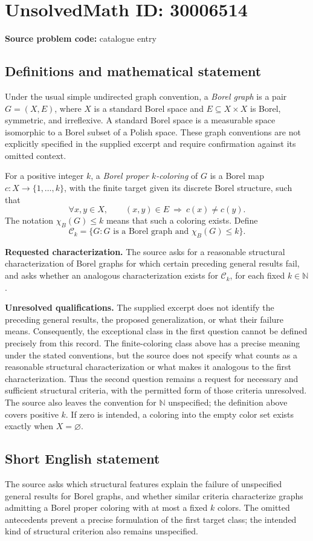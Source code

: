 \documentclass[11pt]{article}
\begin{document}
\section*{UnsolvedMath ID: 30006514}
\textbf{Source problem code:} catalogue entry
\subsection{Definitions and mathematical statement}
Under the usual simple undirected graph convention, a \emph{Borel graph} is a pair \(G=(X,E)\), where \(X\) is a standard Borel space and \(E\subseteq X\times X\) is Borel, symmetric, and irreflexive. A standard Borel space is a measurable space isomorphic to a Borel subset of a Polish space. These graph conventions are not explicitly specified in the supplied excerpt and require confirmation against its omitted context.

For a positive integer \(k\), a \emph{Borel proper \(k\)-coloring} of \(G\) is a Borel map \(c:X\to\{1,\ldots,k\}\), with the finite target given its discrete Borel structure, such that
\[
\forall x,y\in X,\qquad (x,y)\in E\ \Longrightarrow\ c(x)\ne c(y).
\]
The notation \(\chi_B(G)\le k\) means that such a coloring exists. Define
\[
\mathcal C_k=\{G:G\text{ is a Borel graph and }\chi_B(G)\le k\}.
\]

\textbf{Requested characterization.} The source asks for a reasonable structural characterization of Borel graphs for which certain preceding general results fail, and asks whether an analogous characterization exists for \(\mathcal C_k\), for each fixed \(k\in\mathbb N\).

\textbf{Unresolved qualifications.} The supplied excerpt does not identify the preceding general results, the proposed generalization, or what their failure means. Consequently, the exceptional class in the first question cannot be defined precisely from this record. The finite-coloring class above has a precise meaning under the stated conventions, but the source does not specify what counts as a reasonable structural characterization or what makes it analogous to the first characterization. Thus the second question remains a request for necessary and sufficient structural criteria, with the permitted form of those criteria unresolved. The source also leaves the convention for \(\mathbb N\) unspecified; the definition above covers positive \(k\). If zero is intended, a coloring into the empty color set exists exactly when \(X=\varnothing\).
\subsection{Short English statement}
The source asks which structural features explain the failure of unspecified general results for Borel graphs, and whether similar criteria characterize graphs admitting a Borel proper coloring with at most a fixed \(k\) colors. The omitted antecedents prevent a precise formulation of the first target class; the intended kind of structural criterion also remains unspecified.
\end{document}
